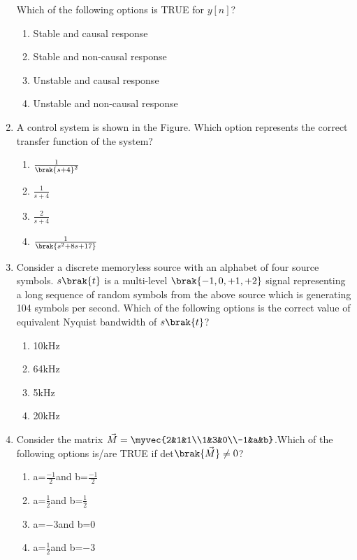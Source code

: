 \begin{enumerate}[label=\thesubsection.\arabic*,ref=\thesubsection.\theenumi]
Which of the following options is TRUE for $y[n]$?
	\begin{enumerate}
		\item Stable and causal response
		\item Stable and non-causal response
		\item Unstable and causal response
		\item Unstable and non-causal response
	\end{enumerate}
\item A control system is shown in the Figure.
	Which option represents the correct transfer function of the system?
	\begin{multicols}{4}
		\begin{enumerate}
			\item $\frac{1}{\brak{s+4}^2}$
			\item $\frac{1}{s+4}$
			\item $\frac{2}{s+4}$
			\item $\frac{1}{\brak{s^2+8s+17}}$
		\end{enumerate}
	\end{multicols}
\item Consider a discrete memoryless source with an alphabet of four source symbols.
	$s\brak{t}$ is a multi-level $\brak{-1, 0, +1, +2}$ signal representing a long sequence of random
symbols from the above source which is generating 104 symbols per second.
Which of the following options is the correct value of equivalent Nyquist
bandwidth of $s\brak{t}$?
\begin{multicols}{4}
	\begin{enumerate}
		\item 10kHz
		\item 64kHz
		\item 5kHz
		\item 20kHz
	\end{enumerate}
\end{multicols}
\item Consider the matrix $\vec{M}=\myvec{2&1&1\\1&3&0\\-1&a&b}$.Which of the following options is/are TRUE if det$\brak{\vec{M}}\neq0$?
\begin{multicols}{4}
	\begin{enumerate}
		\item a=$\frac{-1}{2}$and b=$\frac{-1}{2}$
		\item a=$\frac{1}{2}$and b=$\frac{1}{2}$
		\item a=$-3$and b=$0$
		\item a=$\frac{1}{2}$and b=$-3$
	\end{enumerate}
\end{multicols}


\end{enumerate}
